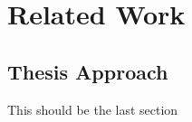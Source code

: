 \chapter{Related Work} %
\label{chap:Chapter3}       %


\section{Thesis Approach}
This should be the last section

